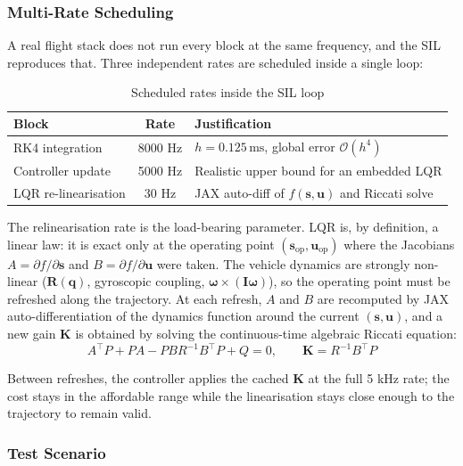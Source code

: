 \documentclass[11pt,a4paper]{article}
\begin{document}
\subsubsection{Multi-Rate Scheduling}

A real flight stack does not run every block at the same frequency, and the SIL reproduces that. Three independent rates are scheduled inside a single loop:

\begin{table}[H]
\centering
\begin{tabular}{|l|c|l|}
\hline
\textbf{Block} & \textbf{Rate} & \textbf{Justification} \\
\hline
RK4 integration            & 8000 Hz & $h = 0.125\,\text{ms}$, global error $\mathcal{O}(h^4)$ \\
\hline
Controller update          & 5000 Hz & Realistic upper bound for an embedded LQR \\
\hline
LQR re-linearisation       &   30 Hz & JAX auto-diff of $f(\mathbf{s},\mathbf{u})$ and Riccati solve \\
\hline
\end{tabular}
\caption{Scheduled rates inside the SIL loop}
\label{tab:sil_rates}
\end{table}

The relinearisation rate is the load-bearing parameter. LQR is, by definition, a linear law: it is exact only at the operating point $(\mathbf{s}_{\text{op}},\mathbf{u}_{\text{op}})$ where the Jacobians $A=\partial f/\partial\mathbf{s}$ and $B=\partial f/\partial\mathbf{u}$ were taken. The vehicle dynamics are strongly non-linear ($\mathbf{R}(\mathbf{q})$, gyroscopic coupling, $\boldsymbol{\omega}\times(\mathbf{I}\boldsymbol{\omega})$), so the operating point must be refreshed along the trajectory. At each refresh, $A$ and $B$ are recomputed by JAX auto-differentiation of the dynamics function around the current $(\mathbf{s},\mathbf{u})$, and a new gain $\mathbf{K}$ is obtained by solving the continuous-time algebraic Riccati equation:
\[
A^\top P + P A - P B R^{-1} B^\top P + Q = 0,
\qquad
\mathbf{K} = R^{-1} B^\top P
\]

Between refreshes, the controller applies the cached $\mathbf{K}$ at the full 5 kHz rate; the cost stays in the affordable range while the linearisation stays close enough to the trajectory to remain valid.

\subsubsection{Test Scenario}
\end{document}
